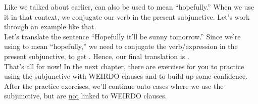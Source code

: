Like we talked about earlier,  can also be used to mean ``hopefully.'' When we use it in that context, we conjugate our verb in the present subjunctive. Let's work through an example like that. \\

Let's translate the sentence ``Hopefully it'll be sunny tomorrow.'' Since we're using  to mean ``hopefully,'' we need to conjugate the verb/expression  in the present subjunctive, to get . Hence, our final translation is .\\

That's all for now! In the next chapter, there are exercises for you to practice using the subjunctive with WEIRDO clauses and to build up some confidence. After the practice exercises, we'll continue onto cases where we use the subjunctive, but are \underline{not} linked to WEIRDO clauses. 
